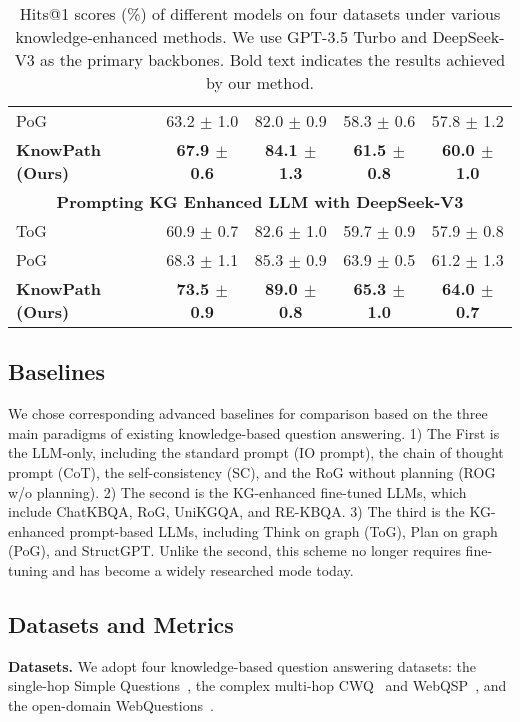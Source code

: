 \begin{table*}[ht]
\begin{tabular}{lcccc}
PoG~\cite{pog}                          & 63.2 $\pm$ 1.0         & 82.0 $\pm$ 0.9            & 58.3 $\pm$ 0.6              & 57.8 $\pm$ 1.2               \\ 
\textbf{KnowPath (Ours)}                   & \textbf{67.9 $\pm$ 0.6} & \textbf{84.1 $\pm$ 1.3}   & \textbf{61.5 $\pm$ 0.8}     & \textbf{60.0 $\pm$ 1.0}      \\
\midrule
\multicolumn{5}{c}{\textbf{Prompting KG Enhanced LLM with DeepSeek-V3}} \\ 
\midrule
ToG~\cite{tog}           & 60.9 $\pm$ 0.7     & 82.6 $\pm$ 1.0         & 59.7 $\pm$ 0.9      & 57.9 $\pm$ 0.8                  \\ 
PoG~\cite{pog}              & 68.3 $\pm$ 1.1        & 85.3 $\pm$ 0.9         & 63.9 $\pm$ 0.5       & 61.2 $\pm$ 1.3           \\ 
\textbf{KnowPath (Ours)}     & \textbf{73.5 $\pm$ 0.9}     & \textbf{89.0 $\pm$ 0.8}        & \textbf{65.3 $\pm$ 1.0}       & \textbf{64.0 $\pm$ 0.7}       \\ 
\bottomrule
\end{tabular}

\caption{Hits@1 scores (\%) of different models on four datasets under various knowledge-enhanced methods. We use GPT-3.5 Turbo and DeepSeek-V3 as the primary backbones. Bold text indicates the results achieved by our method.}
\label{tab:comparison}
\end{table*}

\subsection{Baselines}


We chose corresponding advanced baselines for comparison based on the three main paradigms of existing knowledge-based question answering.
1) The First is the LLM-only, including the standard prompt (IO prompt\cite{ioprompt}), the chain of thought prompt (CoT\cite{cot}), the self-consistency (SC\cite{sc}), and the RoG without planning (ROG w/o planning\cite{rog}).
2) The second is the KG-enhanced fine-tuned LLMs, which include ChatKBQA\cite{chatkbqa}, RoG\cite{rog}, UniKGQA\cite{unikgqa}, and RE-KBQA\cite{re-kbqa}.
3) The third is the KG-enhanced prompt-based LLMs, including Think on graph (ToG\cite{tog}), Plan on graph (PoG\cite{pog}), and StructGPT\cite{structgpt}. 
Unlike the second, this scheme no longer requires fine-tuning and has become a widely researched mode today.


\subsection{Datasets and Metrics}
\textbf{Datasets.}
We adopt four knowledge-based question answering datasets: the single-hop Simple Questions~\cite{simpleqa}, the complex multi-hop CWQ~\cite{cwq} and WebQSP~\cite{webqsp}, and the open-domain WebQuestions~\cite{webquestion}.

